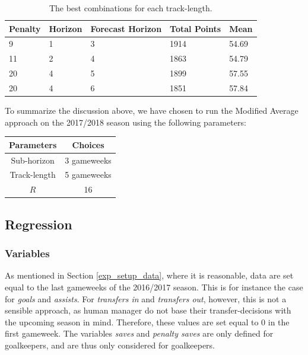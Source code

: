 \begin{table}[H]
\centering
\begin{tabular}{|l|l|l|l|l|}
\hline
Penalty & Horizon & Forecast Horizon & Total Points & Mean  \\
\hline
9       & 1       & 3                & 1914         & 54.69 \\
11      & 2       & 4                & 1863         & 54.79 \\
20      & 4       & 5                & 1899         & 57.55 \\
20      & 4       & 6                & 1851         & 57.84 \\
\hline
\end{tabular}
\caption{The best combinations for each track-length.}
\label{tab:top_5}
\end{table}


\newpar
To summarize the discussion above, we have chosen to run the Modified Average approach on the 2017/2018 season using the following parameters:

\begin{table}[H]
    \centering
    \begin{tabular}{|c|c|}
    \hline
    Parameters      &   Choices \\
    \hline
    Sub-horizon     &   3 gameweeks \\
    Track-length    &   5 gameweeks \\ 
    $R$             &   16 \\ 
    \hline
    \end{tabular}
\end{table}

\subsection{Regression}\label{exp_setup_reg}

\subsubsection{Variables}

As mentioned in Section \ref{exp_setup_data}, where it is reasonable, data are set equal to the last gameweeks of the 2016/2017 season. This is for instance the case for \textit{goals} and \textit{assists}. For \textit{transfers in} and \textit{transfers out}, however, this is not a sensible approach, as human manager do not base their transfer-decisions with the upcoming season in mind. Therefore, these values are set equal to 0 in the first gameweek. The variables \textit{saves} and \textit{penalty saves} are only defined for goalkeepers, and are thus only considered for goalkeepers.

